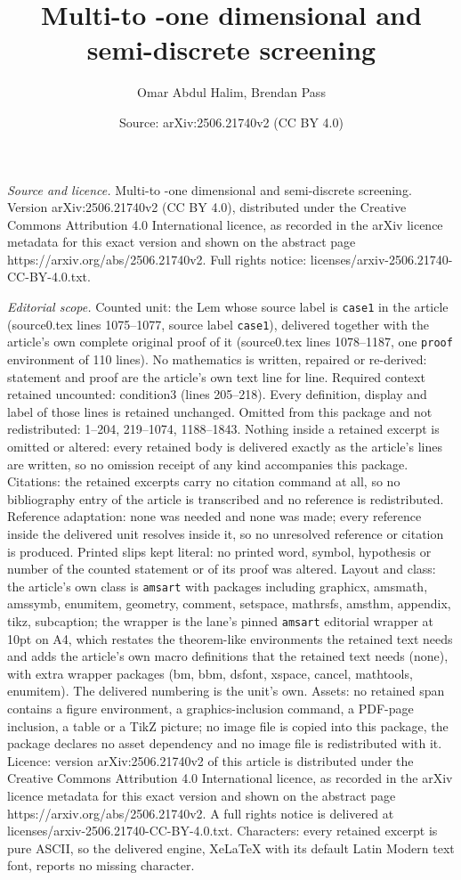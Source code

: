 \documentclass[10pt,a4paper]{amsart}
\title[Multi-to -one dimensional and semi-discrete screening]{Multi-to -one dimensional and semi-discrete screening}
\author{Omar Abdul Halim, Brendan Pass}
\date{Source: arXiv:2506.21740v2 (CC BY 4.0)}
\begin{document}
\maketitle

\noindent\emph{Source and licence.} Multi-to -one dimensional and semi-discrete screening. Version arXiv:2506.21740v2 (CC BY 4.0), distributed under the Creative Commons Attribution 4.0 International licence, as recorded in the arXiv licence metadata for this exact version and shown on the abstract page https://arxiv.org/abs/2506.21740v2. Full rights notice: licenses/arxiv-2506.21740-CC-BY-4.0.txt.\par\smallskip

\noindent\textit{Editorial scope.} Counted unit: the Lem whose source label is \texttt{case1} in the article (source0.tex lines 1075--1077, source label \texttt{case1}), delivered together with the article's own complete original proof of it (source0.tex lines 1078--1187, one \texttt{proof} environment of 110 lines). No mathematics is written, repaired or re-derived: statement and proof are the article's own text line for line. Required context retained uncounted: condition3 (lines 205--218). Every definition, display and label of those lines is retained unchanged. Omitted from this package and not redistributed: 1--204, 219--1074, 1188--1843. Nothing inside a retained excerpt is omitted or altered: every retained body is delivered exactly as the article's lines are written, so no omission receipt of any kind accompanies this package. Citations: the retained excerpts carry no citation command at all, so no bibliography entry of the article is transcribed and no reference is redistributed. Reference adaptation: none was needed and none was made; every reference inside the delivered unit resolves inside it, so no unresolved reference or citation is produced. Printed slips kept literal: no printed word, symbol, hypothesis or number of the counted statement or of its proof was altered. Layout and class: the article's own class is \texttt{amsart} with packages including graphicx, amsmath, amssymb, enumitem, geometry, comment, setspace, mathrsfs, amsthm, appendix, tikz, subcaption; the wrapper is the lane's pinned \texttt{amsart} editorial wrapper at 10pt on A4, which restates the theorem-like environments the retained text needs and adds the article's own macro definitions that the retained text needs (none), with extra wrapper packages (bm, bbm, dsfont, xspace, cancel, mathtools, enumitem). The delivered numbering is the unit's own. Assets: no retained span contains a figure environment, a graphics-inclusion command, a PDF-page inclusion, a table or a TikZ picture; no image file is copied into this package, the package declares no asset dependency and no image file is redistributed with it. Licence: version arXiv:2506.21740v2 of this article is distributed under the Creative Commons Attribution 4.0 International licence, as recorded in the arXiv licence metadata for this exact version and shown on the abstract page https://arxiv.org/abs/2506.21740v2. A full rights notice is delivered at licenses/arxiv-2506.21740-CC-BY-4.0.txt. Characters: every retained excerpt is pure ASCII, so the delivered engine, XeLaTeX with its default Latin Modern text font, reports no missing character.
\end{document}
